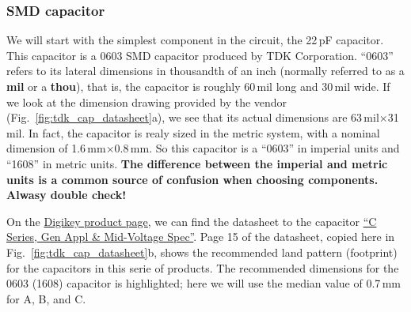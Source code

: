 \documentclass[12pt,letterpaper]{scrartcl}
\begin{document}
\subsubsection{SMD capacitor}

We will start with the simplest component in the circuit, the 22\,pF capacitor. This capacitor is a 0603 SMD capacitor produced by TDK Corporation. ``0603'' refers to its lateral dimensions in thousandth of an inch (normally referred to as a \textbf{mil} or a \textbf{thou}), that is, the capacitor is roughly 60\,mil long and 30\,mil wide. If we look at the dimension drawing provided by the vendor (Fig.~\ref{fig:tdk_cap_datasheet}a), we see that its actual dimensions are 63\,mil$\times$31\,mil. In fact, the capacitor is realy sized in the metric system, with a nominal dimension of 1.6\,mm$\times$0.8\,mm. So this capacitor is a ``0603'' in imperial units and ``1608'' in metric units. \textbf{The difference between the imperial and metric units is a common source of confusion when choosing components. Alwasy double check!}

On the \href{http://www.digikey.com/product-detail/en/C1608C0G1H220J080AA/445-1273-1-ND/567670}{Digikey product page}, we can find the datasheet to the capacitor \href{http://product.tdk.com/en/catalog/spec/mlccspec_commercial_general_midvoltage_en.pdf}{``C Series, Gen Appl \& Mid-Voltage Spec''}. Page 15 of the datasheet, copied here in Fig.~\ref{fig:tdk_cap_datasheet}b, shows the recommended land pattern (footprint) for the capacitors in this serie of products. The recommended dimensions for the 0603 (1608) capacitor is highlighted; here we will use the median value of 0.7\,mm for A, B, and C. 
\end{document}
